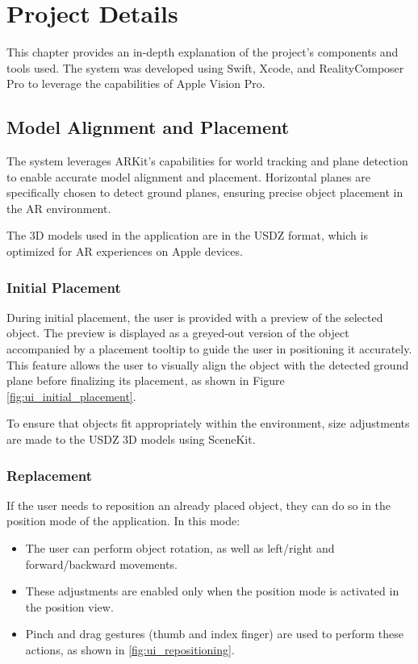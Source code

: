 \chapter{Project Details}

This chapter provides an in-depth explanation of the project's components and tools used. The system was developed using Swift, Xcode, and RealityComposer Pro to leverage the capabilities of Apple Vision Pro.



\section{Model Alignment and Placement}

The system leverages ARKit’s capabilities for world tracking and plane detection to enable accurate model alignment and placement. Horizontal planes are specifically chosen to detect ground planes, ensuring precise object placement in the AR environment.

The 3D models used in the application are in the USDZ format, which is optimized for AR experiences on Apple devices.
\subsection{Initial Placement}
During initial placement, the user is provided with a preview of the selected object. The preview is displayed as a greyed-out version of the object accompanied by a placement tooltip to guide the user in positioning it accurately. This feature allows the user to visually align the object with the detected ground plane before finalizing its placement, as shown in Figure \ref{fig:ui_initial_placement}.

To ensure that objects fit appropriately within the environment, size adjustments are made to the USDZ 3D models using SceneKit. 
\subsection{Replacement}
If the user needs to reposition an already placed object, they can do so in the position mode of the application. In this mode:
\begin{itemize}
    \item The user can perform object rotation, as well as left/right and forward/backward movements.
    \item These adjustments are enabled only when the position mode is activated in the position view.
    \item Pinch and drag gestures (thumb and index finger) are used to perform these actions, as shown in \ref{fig:ui_repositioning}.
\end{itemize}

